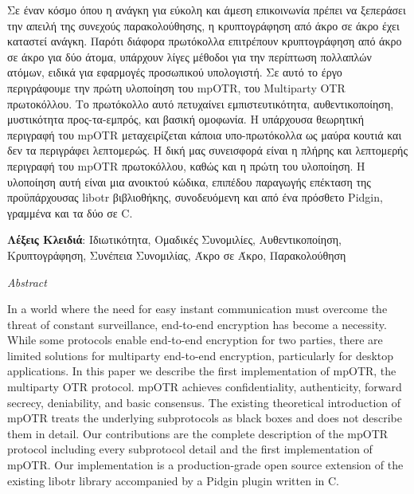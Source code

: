 \documentclass[
11pt, %
english, %
singlespacing, %
parskip, %
headsepline, %
]{MastersDoctoralThesis} %
\begin{document}
Σε έναν κόσμο όπου η ανάγκη για εύκολη και άμεση επικοινωνία πρέπει να ξεπεράσει την απειλή της συνεχούς παρακολούθησης, η κρυπτογράφηση από άκρο σε άκρο έχει καταστεί ανάγκη.
Παρότι διάφορα πρωτόκολλα επιτρέπουν κρυπτογράφηση από άκρο σε άκρο για δύο άτομα, υπάρχουν λίγες μέθοδοι για την περίπτωση πολλαπλών ατόμων, ειδικά για εφαρμογές προσωπικού υπολογιστή.
Σε αυτό το έργο περιγράφουμε την πρώτη υλοποίηση του mpOTR, του Multiparty OTR πρωτοκόλλου.
Το πρωτόκολλο αυτό πετυχαίνει εμπιστευτικότητα, αυθεντικοποίηση, μυστικότητα προς-τα-εμπρός, και βασική ομοφωνία.
Η υπάρχουσα θεωρητική περιγραφή του mpOTR μεταχειρίζεται κάποια υπο-πρωτόκολλα ως μαύρα κουτιά και δεν τα περιγράφει λεπτομερώς.
Η δική μας συνεισφορά είναι η πλήρης και λεπτομερής περιγραφή του mpOTR πρωτοκόλλου, καθώς και η πρώτη του υλοποίηση.
Η υλοποίηση αυτή είναι μια ανοικτού κώδικα, επιπέδου παραγωγής επέκταση της προϋπάρχουσας libotr βιβλιοθήκης, συνοδευόμενη και από ένα πρόσθετο Pidgin, γραμμένα και τα δύο σε C.

  \vspace*{\fill}

  {\bf Λέξεις Κλειδιά}: Ιδιωτικότητα, Ομαδικές Συνομιλίες, Αυθεντικοποίηση, Κρυπτογράφηση, Συνέπεια Συνομιλίας, Άκρο σε Άκρο, Παρακολούθηση

\pagebreak



\thispagestyle{plain}
\begin{center}
  {\huge\textit{Abstract} \par}
  \bigskip
\end{center}

In a world where the need for easy instant communication must overcome the threat of constant surveillance, end-to-end encryption has become a necessity.
While some protocols enable end-to-end encryption for two parties, there are limited solutions for multiparty end-to-end encryption, particularly for desktop applications.
In this paper we describe the first implementation of mpOTR, the multiparty OTR protocol.
mpOTR achieves confidentiality, authenticity, forward secrecy, deniability, and basic consensus.
The existing theoretical introduction of mpOTR treats the underlying subprotocols as black boxes and does not describe them in detail.
Our contributions are the complete description of the mpOTR protocol including every subprotocol detail and the first implementation of mpOTR.
Our implementation is a production-grade open source extension of the existing libotr library accompanied by a Pidgin plugin written in C.
\end{document}
